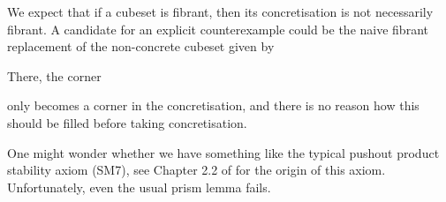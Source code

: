 \begin{remark}
We expect that if a cubeset is fibrant, then its concretisation is not necessarily fibrant.
A candidate for an explicit counterexample could be the naive fibrant replacement of the non-concrete cubeset given by
\begin{center}
\end{center}
	There, the corner
\begin{center}
\end{center}
only becomes a corner in the concretisation, and there is no reason how this should be filled before taking concretisation.
\end{remark}

One might wonder whether we have something like the typical pushout product stability axiom (SM7), see Chapter 2.2 of \cite{Quillen1967} for the origin of this axiom.
Unfortunately, even the usual prism lemma fails.

